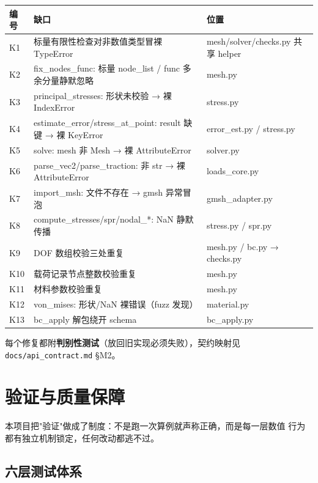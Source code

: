 \documentclass[12pt,a4paper]{ctexart}
\newcommand{\fem}{\Verb}
\begin{document}
\begin{longtable}{p{1.4cm}p{7.9cm}p{5.3cm}}
\toprule
\textbf{编号} & \textbf{缺口} & \textbf{位置} \\
\midrule
K1 & 标量有限性检查对非数值类型冒裸 TypeError & mesh/solver/checks.py 共享 helper \\
K2 & fix\_nodes\_func: 标量 node\_list / func 多余分量静默忽略 & mesh.py \\
K3 & principal\_stresses: 形状未校验 → 裸 IndexError & stress.py \\
K4 & estimate\_error/stress\_at\_point: result 缺键 → 裸 KeyError & error\_est.py / stress.py \\
K5 & solve: mesh 非 Mesh → 裸 AttributeError & solver.py \\
K6 & parse\_vec2/parse\_traction: 非 str → 裸 AttributeError & loads\_core.py \\
K7 & import\_msh: 文件不存在 → gmsh 异常冒泡 & gmsh\_adapter.py \\
K8 & compute\_stresses/spr/nodal\_*: NaN 静默传播 & stress.py / spr.py \\
K9 & DOF 数组校验三处重复 & mesh.py / bc.py → checks.py \\
K10 & 载荷记录节点整数校验重复 & mesh.py \\
K11 & 材料参数校验重复 & mesh.py \\
K12 & von\_mises: 形状/NaN 裸错误（fuzz 发现） & material.py \\
K13 & bc\_apply 解包绕开 schema & bc\_apply.py \\
\bottomrule
\end{longtable}

每个修复都附\textbf{判别性测试}（放回旧实现必须失败），契约映射见\newline
\fem|docs/api_contract.md| §M2。

\section{验证与质量保障}

本项目把"验证"做成了制度：不是跑一次算例就声称正确，而是每一层数值
行为都有独立机制锁定，任何改动都逃不过。

\subsection{六层测试体系}
\end{document}
